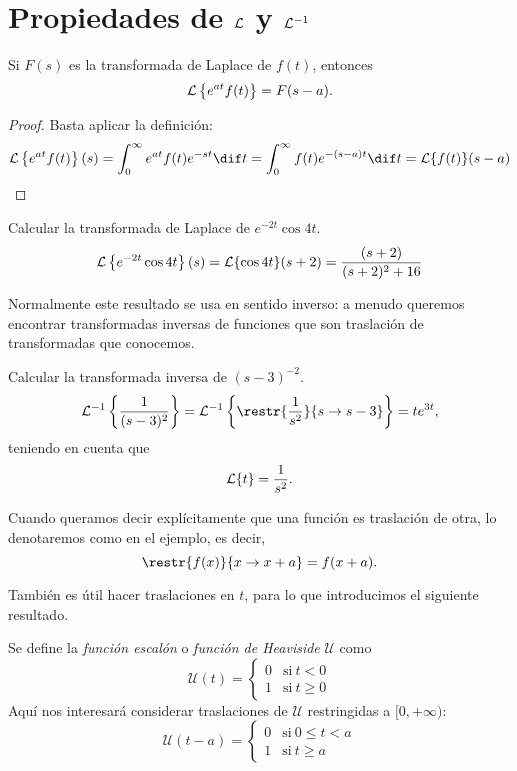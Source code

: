 \documentclass[../ecuaciones_diferenciales.tex]{subfiles}
\begin{document}
\section{Propiedades de \(\mathcal{L}\) y \(\mathcal{L}^{-1}\)}
\begin{proposition}
	Si \(F(s)\) es la transformada de Laplace de \(f(t)\), entonces
	\[\mathcal{L}\left\{e^{at}f(t)\right\} = F(s-a).\]
	\begin{proof}
		Basta aplicar la definición:
		\[\L\left\{e^{at}f(t)\right\}(s) = \int_0^\infty e^{at}f(t) e^{-st} \dif t
			= \int_0^\infty f(t) e^{-(s-a)t} \dif t = \L\{f(t)\}(s-a)\]
	\end{proof}
\end{proposition}

\begin{example}
	Calcular la transformada de Laplace de \(e^{-2t} \cos 4t\).
	\[\mathcal{L}\left\{e^{-2t} \cos 4t\right\}(s) = \mathcal{L}\{\cos 4t\}(s+2)
		= \frac{(s+2)}{(s+2)^2+16}\]
\end{example}

Normalmente este resultado se usa en sentido inverso: a menudo queremos
encontrar transformadas inversas de funciones que son traslación de
transformadas que conocemos.

\begin{example}
	Calcular la transformada inversa de \((s-3)^{-2}\).
	\[\L^{-1}\left\{\frac{1}{(s-3)^2}\right\} = \L^{-1}\left\{\restr{\frac{1}{s^2}}{s
			\to s-3}\right\} = te^{3t},\]
	teniendo en cuenta que
	\[\mathcal{L}\{t\} = \frac{1}{s^2}.\]
\end{example}

\begin{notation}
	Cuando queramos decir explícitamente que una función es
	traslación de otra, lo denotaremos como en el ejemplo, es decir,
	\[\restr{f(x)}{x \to x+a} = f(x+a).\]
\end{notation}

También es útil hacer traslaciones en \(t\), para lo que introducimos el
siguiente resultado.

\begin{definition}
	Se define la \emph{función escalón} o \emph{función de Heaviside} \(\mathcal{U}\) como
	\[\mathcal{U}(t) =
		\begin{cases}
			0 & \mathrm{si}\ t < 0    \\
			1 & \mathrm{si}\ t \geq 0
		\end{cases}
	\]
	Aquí nos interesará considerar traslaciones de \(\mathcal{U}\) restringidas a
	\([0,+\infty)\):
	\[\mathcal{U}(t-a) =
		\begin{cases}
			0 & \mathrm{si}\ 0 \leq t < a \\
			1 & \mathrm{si}\ t \geq a
		\end{cases}
	\]
\end{definition}
\end{document}
